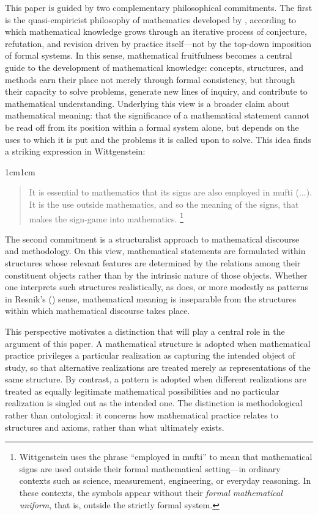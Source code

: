\documentclass[11pt,a4paper]{article}
\begin{document}
This paper is guided by two complementary philosophical commitments. The first is the quasi-empiricist philosophy of mathematics developed by \textcite{Lakatos1976}, according to which mathematical knowledge grows through an iterative process of conjecture, refutation, and revision driven by practice itself—not by the top-down imposition of formal systems. In this sense, mathematical fruitfulness becomes a central guide to the development of mathematical knowledge: concepts, structures, and methods earn their place not merely through formal consistency, but through their capacity to solve problems, generate new lines of inquiry, and contribute to mathematical understanding. Underlying this view is a broader claim about mathematical meaning: that the significance of a mathematical statement cannot be read off from its position within a formal system alone, but depends on the uses to which it is put and the problems it is called upon to solve. This idea finds a striking expression in Wittgenstein:

\begin{adjustwidth}{1cm}{1cm}
\small
\begin{quote}
It is essential to mathematics that its signs are also employed in mufti (...). It is the use outside mathematics, and so the meaning of the signs, that makes the sign-game into mathematics. \parencite[V §2]{Wittgenstein1978}\footnote{Wittgenstein uses the phrase “employed in mufti” to mean that mathematical signs are used outside their formal mathematical setting—in ordinary contexts such as science, measurement, engineering, or everyday reasoning. In these contexts, the symbols appear without their \textit{formal mathematical uniform}, that is, outside the strictly formal system.}
\end{quote}
\end{adjustwidth}

The second commitment is a structuralist approach to mathematical discourse and methodology. On this view, mathematical statements are formulated within structures whose relevant features are determined by the relations among their constituent objects rather than by the intrinsic nature of those objects. Whether one interprets such structures realistically, as \textcite{Shapiro1997} does, or more modestly as patterns in Resnik's (\citeyear{Resnik1981}) sense, mathematical meaning is inseparable from the structures within which mathematical discourse takes place.

This perspective motivates a distinction that will play a central role in the argument of this paper. A mathematical structure is adopted when mathematical practice privileges a particular realization as capturing the intended object of study, so that alternative realizations are treated merely as representations of the same structure. By contrast, a pattern is adopted when different realizations are treated as equally legitimate mathematical possibilities and no particular realization is singled out as the intended one. The distinction is methodological rather than ontological: it concerns how mathematical practice relates to structures and axioms, rather than what ultimately exists.
\end{document}
